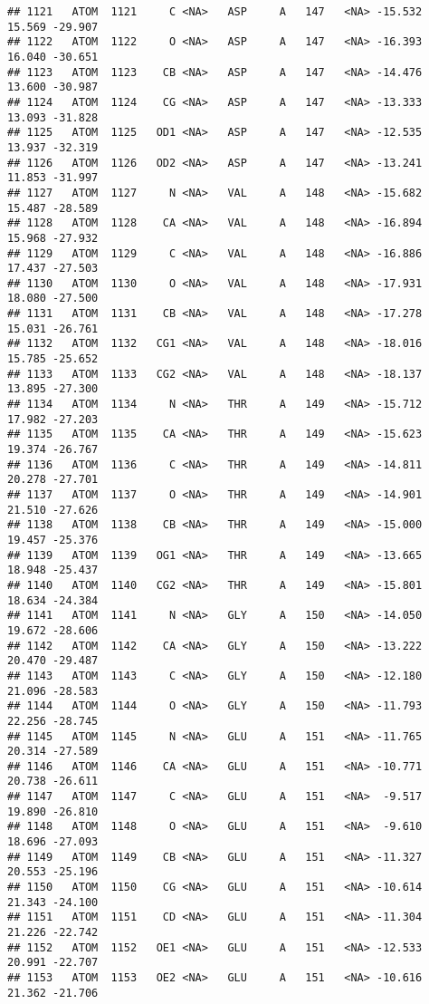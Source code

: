 \documentclass[
]{article}
\begin{document}
\begin{verbatim}
## 1121   ATOM  1121     C <NA>   ASP     A   147   <NA> -15.532  15.569 -29.907
## 1122   ATOM  1122     O <NA>   ASP     A   147   <NA> -16.393  16.040 -30.651
## 1123   ATOM  1123    CB <NA>   ASP     A   147   <NA> -14.476  13.600 -30.987
## 1124   ATOM  1124    CG <NA>   ASP     A   147   <NA> -13.333  13.093 -31.828
## 1125   ATOM  1125   OD1 <NA>   ASP     A   147   <NA> -12.535  13.937 -32.319
## 1126   ATOM  1126   OD2 <NA>   ASP     A   147   <NA> -13.241  11.853 -31.997
## 1127   ATOM  1127     N <NA>   VAL     A   148   <NA> -15.682  15.487 -28.589
## 1128   ATOM  1128    CA <NA>   VAL     A   148   <NA> -16.894  15.968 -27.932
## 1129   ATOM  1129     C <NA>   VAL     A   148   <NA> -16.886  17.437 -27.503
## 1130   ATOM  1130     O <NA>   VAL     A   148   <NA> -17.931  18.080 -27.500
## 1131   ATOM  1131    CB <NA>   VAL     A   148   <NA> -17.278  15.031 -26.761
## 1132   ATOM  1132   CG1 <NA>   VAL     A   148   <NA> -18.016  15.785 -25.652
## 1133   ATOM  1133   CG2 <NA>   VAL     A   148   <NA> -18.137  13.895 -27.300
## 1134   ATOM  1134     N <NA>   THR     A   149   <NA> -15.712  17.982 -27.203
## 1135   ATOM  1135    CA <NA>   THR     A   149   <NA> -15.623  19.374 -26.767
## 1136   ATOM  1136     C <NA>   THR     A   149   <NA> -14.811  20.278 -27.701
## 1137   ATOM  1137     O <NA>   THR     A   149   <NA> -14.901  21.510 -27.626
## 1138   ATOM  1138    CB <NA>   THR     A   149   <NA> -15.000  19.457 -25.376
## 1139   ATOM  1139   OG1 <NA>   THR     A   149   <NA> -13.665  18.948 -25.437
## 1140   ATOM  1140   CG2 <NA>   THR     A   149   <NA> -15.801  18.634 -24.384
## 1141   ATOM  1141     N <NA>   GLY     A   150   <NA> -14.050  19.672 -28.606
## 1142   ATOM  1142    CA <NA>   GLY     A   150   <NA> -13.222  20.470 -29.487
## 1143   ATOM  1143     C <NA>   GLY     A   150   <NA> -12.180  21.096 -28.583
## 1144   ATOM  1144     O <NA>   GLY     A   150   <NA> -11.793  22.256 -28.745
## 1145   ATOM  1145     N <NA>   GLU     A   151   <NA> -11.765  20.314 -27.589
## 1146   ATOM  1146    CA <NA>   GLU     A   151   <NA> -10.771  20.738 -26.611
## 1147   ATOM  1147     C <NA>   GLU     A   151   <NA>  -9.517  19.890 -26.810
## 1148   ATOM  1148     O <NA>   GLU     A   151   <NA>  -9.610  18.696 -27.093
## 1149   ATOM  1149    CB <NA>   GLU     A   151   <NA> -11.327  20.553 -25.196
## 1150   ATOM  1150    CG <NA>   GLU     A   151   <NA> -10.614  21.343 -24.100
## 1151   ATOM  1151    CD <NA>   GLU     A   151   <NA> -11.304  21.226 -22.742
## 1152   ATOM  1152   OE1 <NA>   GLU     A   151   <NA> -12.533  20.991 -22.707
## 1153   ATOM  1153   OE2 <NA>   GLU     A   151   <NA> -10.616  21.362 -21.706

\end{verbatim}
\end{document}
